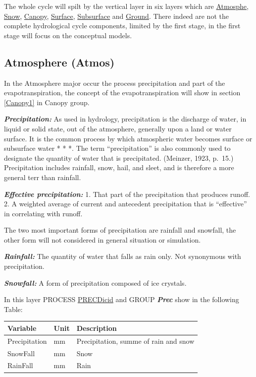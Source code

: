 \documentclass[
]{book}
\begin{document}
The whole cycle will spilt by the vertical layer in six layers which are \protect\hyperlink{Atmosphe1}{Atmosphe}, \protect\hyperlink{Snow1}{Snow}, \protect\hyperlink{Canopy1}{Canopy}, \protect\hyperlink{Surface}{Surface}, \protect\hyperlink{Subsurface1}{Subsurface} and \protect\hyperlink{Ground1}{Ground}. There indeed are not the complete hydrological cycle components, limited by the first stage, in the first stage will focus on the conceptual models.

\hypertarget{Atmosphe1}{%
\subsection{Atmosphere (Atmos)}\label{Atmosphe1}}

In the Atmosphere major occur the process precipitation and part of the evapotranspiration, the concept of the evapotranspiration will show in section \ref{Canopy1} in Canopy group.

\textbf{\emph{Precipitation:}} As used in hydrology, precipitation is the discharge of water, in liquid or solid state, out of the atmosphere, generally upon a land or water surface. It is the common process by which atmospheric water becomes surface or subsurface water * * *. The term ``precipitation'' is also commonly used to designate the quantity of water that is precipitated. (Meinzer, 1923, p.~15.) Precipitation includes rainfall, snow, hail, and sleet, and is therefore a more general terr than rainfall.

\textbf{\emph{Effective precipitation:}} 1. That part of the precipitation that produces runoff. 2. A weighted average of current and antecedent precipitation that is ``effective'' in correlating with runoff.\citep{LANGBEIN.1960}

The two most important forms of precipitation are rainfall and snowfall, the other form will not considered in general situation or simulation.

\textbf{\emph{Rainfall:}} The quantity of water that falls as rain only. Not synonymous with precipitation.

\textbf{\emph{Snowfall:}} A form of precipitation composed of ice crystals.

In this layer PROCESS \protect\hyperlink{SNOW}{PRECDicid} and GROUP \textbf{\emph{Prec}} show in the following Table:

\begin{table}[!h]
\centering
\begin{tabular}{l|l|l}
\hline
Variable & Unit & Description\\
\hline
Precipitation & mm & Precipitation, summe of rain and snow\\
\cline{1-3}
SnowFall & mm & Snow\\
\cline{1-3}
RainFall & mm & Rain\\
\hline
\end{tabular}
\end{table}
\end{document}
